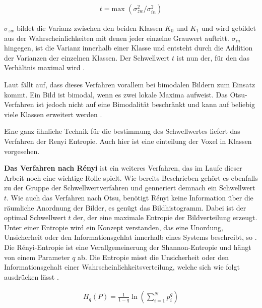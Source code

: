 \begin{align}
	t = \text{max }(\sigma_{zw}^{2}/ \sigma_{in}^{2})
\end{align}

$\sigma_{zw}$ bildet die Varianz zwischen den beiden Klassen $K_{0}$ und $K_{1}$
und wird gebildet aus der Wahrscheinlichkeiten mit denen jeder einzelne Grauwert
auftritt. $\sigma_{in}$ hingegen, ist die Varianz innerhalb einer Klasse und entsteht
durch die Addition der Varianzen der einzelnen Klassen. Der Schwellwert $t$ ist
nun der, für den das Verhältnis maximal wird \citep[vgl.][Seite264]{lehmann2013bildverarbeitung}.

Laut \citet[Seite264]{lehmann2013bildverarbeitung} fällt auf, dass dieses
Verfahren vorallem bei bimodalen Bildern zum Einsatz kommt. Ein Bild ist bimodal,
wenn es zwei lokale Maxima aufweist. Das Otsu-Verfahren ist jedoch nicht auf eine
Bimodalität beschränkt und kann auf beliebig viele Klassen erweitert werden \citep[vgl.][Seite264]{lehmann2013bildverarbeitung}.

Eine ganz ähnliche Technik für die bestimmung des Schwellwertes liefert das Verfahren
der Renyi Entropie. Auch hier ist eine einteilung der Voxel in Klassen
vorgesehen.
\pagebreak

\textbf{Das Verfahren nach Rényi} ist ein weiteres Verfahren, das im Laufe
dieser Arbeit noch eine wichtige Rolle spielt. Wie bereits Beschrieben gehört es
ebenfalls zu der Gruppe der Schwellwertverfahren und genneriert demnach ein Schwellwert
$t$. Wie auch das Verfahren nach Otsu, benötigt Rényi keine Information über die
räumliche Anordnung der Bilder, es genügt das Bildhistogramm. Dabei ist der optimal
Schwellwert $t$ der, der eine maximale Entropie der Bildverteilung erzeugt. Unter
einer Entropie wird ein Konzept verstanden, das eine Unordung, Unsicherheit oder
den Informationsgehlat innerhalb eines Systems beschreibt, so \citet{bein2006}.
Die Rényi-Entropie ist eine Verallgemeinerung der Shannon-Entropie und hängt von
einem Parameter $q$ ab. Die Entropie misst die Unsicherheit oder den Informationsgehalt
einer Wahrscheinlichkeitsverteilung, welche sich wie folgt ausdrücken lässt
\citep[vgl.][K. 2]{bromiley2004}.

\begin{align}
	H_{q}(P) = \frac{1}{1-q}\ln \left( \sum_{i=1}^{N}p_{i}^{q}\right)
\end{align}

